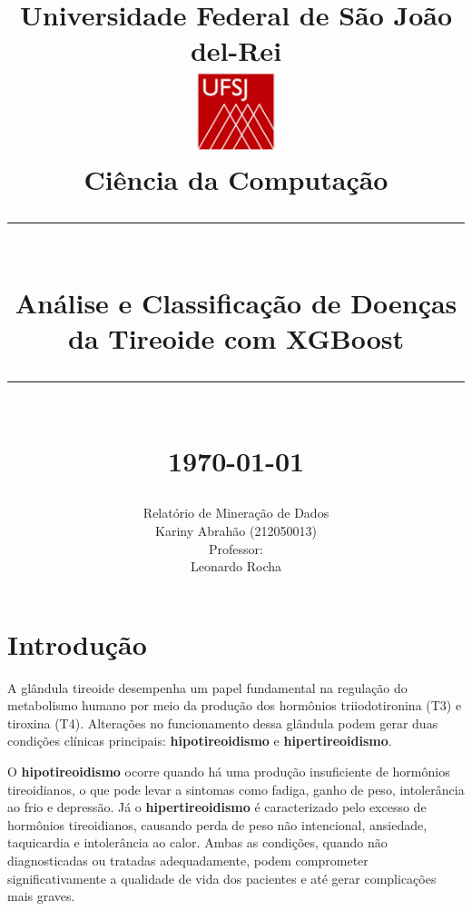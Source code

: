 \documentclass[11pt]{article}
\newcommand{\HRule}[1]{\rule{\linewidth}{#1}}
\begin{document}
\date{}

\title{ \normalsize Universidade Federal de São João del-Rei
		\\ [1.0cm]
		\includegraphics[width=25mm]{img/ufsjbr_logo.jpg}  \\[.5cm]
		\normalsize Ciência da Computação \\ [3.5cm]
		\HRule{2pt} \\
		\LARGE \textbf{Análise e Classificação de Doenças da Tireoide com XGBoost} %
		\HRule{2pt} \\ [0.5cm]
		\normalsize \today \vspace*{5\baselineskip}}
		
\date{}

\author{
        Relatório de Mineração de Dados \\[0.5cm]
		Kariny Abrahão (212050013)            \\[1cm]
		 Professor:        \\
		 Leonardo Rocha
		 }
		 
\maketitle

\newpage

\tableofcontents

\section{Introdução}

A glândula tireoide desempenha um papel fundamental na regulação do metabolismo humano por meio da produção dos hormônios triiodotironina (T3) e tiroxina (T4). Alterações no funcionamento dessa glândula podem gerar duas condições clínicas principais: \textbf{hipotireoidismo} e \textbf{hipertireoidismo}.  

O \textbf{hipotireoidismo} ocorre quando há uma produção insuficiente de hormônios tireoidianos, o que pode levar a sintomas como fadiga, ganho de peso, intolerância ao frio e depressão. Já o \textbf{hipertireoidismo} é caracterizado pelo excesso de hormônios tireoidianos, causando perda de peso não intencional, ansiedade, taquicardia e intolerância ao calor. Ambas as condições, quando não diagnosticadas ou tratadas adequadamente, podem comprometer significativamente a qualidade de vida dos pacientes e até gerar complicações mais graves.  
\end{document}
